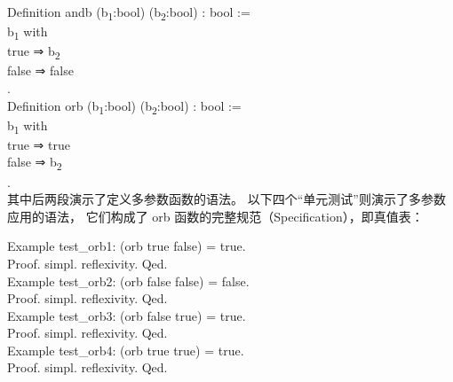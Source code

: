\documentclass[utf8]{ctexart}
\begin{document}

{Definition} {andb} ({b\textsubscript{1}}:{bool})
({b\textsubscript{2}}:{bool}) : {bool} :=\\
\hspace*{0.333em}\hspace*{0.333em}{match} {b\textsubscript{1}} {with}\\
\hspace*{0.333em}\hspace*{0.333em}\textbar{} {true} ⇒
{b\textsubscript{2}}\\
\hspace*{0.333em}\hspace*{0.333em}\textbar{} {false} ⇒ {false}\\
\hspace*{0.333em}\hspace*{0.333em}{end}.\\


{Definition} {orb} ({b\textsubscript{1}}:{bool})
({b\textsubscript{2}}:{bool}) : {bool} :=\\
\hspace*{0.333em}\hspace*{0.333em}{match} {b\textsubscript{1}} {with}\\
\hspace*{0.333em}\hspace*{0.333em}\textbar{} {true} ⇒ {true}\\
\hspace*{0.333em}\hspace*{0.333em}\textbar{} {false} ⇒
{b\textsubscript{2}}\\
\hspace*{0.333em}\hspace*{0.333em}{end}.\\

其中后两段演示了定义多参数函数的语法。
以下四个``单元测试''则演示了多参数应用的语法， 它们构成了 {{orb}}
函数的完整规范（Specification），即真值表：

{Example} {test\_orb1}: ({orb} {true} {false}) = {true}.\\
{Proof}. {simpl}. {reflexivity}. {Qed}.\\
{Example} {test\_orb2}: ({orb} {false} {false}) = {false}.\\
{Proof}. {simpl}. {reflexivity}. {Qed}.\\
{Example} {test\_orb3}: ({orb} {false} {true}) = {true}.\\
{Proof}. {simpl}. {reflexivity}. {Qed}.\\
{Example} {test\_orb4}: ({orb} {true} {true}) = {true}.\\
{Proof}. {simpl}. {reflexivity}. {Qed}.\\
\end{document}
